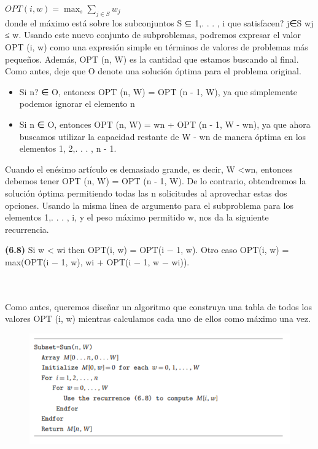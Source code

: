 \documentclass[a4paper]{article}
\begin{document}
$OPT(i,w) = \max_s \sum_{j \in S} w_j$\\

donde el máximo está sobre los subconjuntos S ⊆ {1,. . . , i} que satisfacen? j∈S wj ≤ w. Usando este nuevo conjunto de subproblemas, podremos expresar el valor OPT (i, w) como una expresión simple en términos de valores de problemas más pequeños. Además, OPT (n, W) es la cantidad que estamos buscando al final. Como antes, deje que O denote una solución óptima para el problema original.\\

\begin{itemize}
    \item Si n? ∈ O, entonces OPT (n, W) = OPT (n - 1, W), ya que simplemente podemos ignorar el elemento n
    \item Si n ∈ O, entonces OPT (n, W) = wn + OPT (n - 1, W - wn), ya que ahora buscamos utilizar la capacidad restante de W - wn de manera óptima en los elementos 1, 2,. . . , n - 1.
\end{itemize}

Cuando el enésimo artículo es demasiado grande, es decir, W <wn, entonces debemos tener OPT (n, W) = OPT (n - 1, W). De lo contrario, obtendremos la solución óptima permitiendo todas las n solicitudes al aprovechar estas dos opciones. Usando la misma línea de argumento para el subproblema para los elementos {1,. . . , i}, y el peso máximo permitido w, nos da la siguiente recurrencia.\\

\colorbox{mygray}{\parbox{15cm}{
\textbf{(6.8)} Si w < wi then OPT(i, w) = OPT(i − 1, w). Otro caso
OPT(i, w) = max(OPT(i − 1, w), wi + OPT(i − 1, w − wi)).}}\\\\

Como antes, queremos diseñar un algoritmo que construya una tabla de todos los valores OPT (i, w) mientras calculamos cada uno de ellos como máximo una vez.

\begin{figure}[h]
\centering
\includegraphics[scale=1]{Imagenes-Seccion6/cod6_7.PNG}
\end{figure}\\
\end{document}
